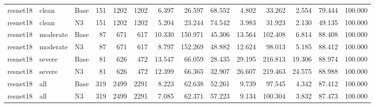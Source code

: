 \begin{tabular}{lllrrrrrrrrrrr}
resnet18 & clean & Base & 151 & 1202 & 1202 & 6.397 & 26.597 & 68.552 & 4.802 & 33.262 & 2.554 & 79.444 & 100.000 \\
resnet18 & clean & N3 & 151 & 1202 & 1202 & 5.204 & 23.244 & 74.542 & 3.983 & 31.923 & 2.130 & 49.135 & 100.000 \\
resnet18 & moderate & Base & 87 & 671 & 617 & 10.330 & 150.971 & 45.306 & 13.564 & 102.408 & 6.814 & 88.408 & 100.000 \\
resnet18 & moderate & N3 & 87 & 671 & 617 & 8.797 & 152.269 & 48.882 & 12.624 & 98.013 & 5.185 & 88.412 & 100.000 \\
resnet18 & severe & Base & 81 & 626 & 472 & 13.547 & 66.059 & 28.435 & 29.195 & 216.813 & 19.306 & 88.974 & 100.000 \\
resnet18 & severe & N3 & 81 & 626 & 472 & 12.399 & 66.365 & 32.907 & 26.607 & 219.463 & 24.575 & 88.988 & 100.000 \\
resnet18 & all & Base & 319 & 2499 & 2291 & 8.223 & 62.638 & 52.261 & 9.739 & 97.545 & 4.342 & 87.412 & 100.000 \\
resnet18 & all & N3 & 319 & 2499 & 2291 & 7.085 & 62.371 & 57.223 & 9.134 & 100.304 & 3.832 & 87.473 & 100.000 \\
\bottomrule
\end{tabular}
